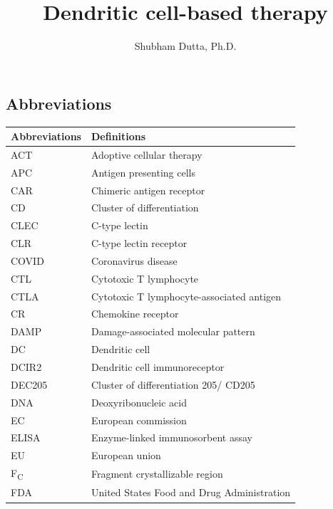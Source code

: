 \documentclass[
]{article}
\title{Dendritic cell-based therapy}
\author{Shubham Dutta, Ph.D.}
\affil{%
                  University of Massachusetts Medical School
              }
\date{}
\begin{document}
\maketitle


\subsection{Abbreviations}\label{abbreviations}

\begin{longtable}[]{@{}
  >{\raggedright\arraybackslash}p{}
  >{\raggedright\arraybackslash}p{}@{}}
\toprule\noalign{}
\begin{minipage}[b]{\linewidth}\raggedright
Abbreviations
\end{minipage} & \begin{minipage}[b]{\linewidth}\raggedright
Definitions
\end{minipage} \\
\midrule\noalign{}
\endhead
\bottomrule\noalign{}
\endlastfoot
ACT & Adoptive cellular therapy \\
APC & Antigen presenting cells \\
CAR & Chimeric antigen receptor \\
CD & Cluster of differentiation \\
CLEC & C-type lectin \\
CLR & C-type lectin receptor \\
COVID & Coronavirus disease \\
CTL & Cytotoxic T lymphocyte \\
CTLA & Cytotoxic T lymphocyte-associated antigen \\
CR & Chemokine receptor \\
DAMP & Damage-associated molecular pattern \\
DC & Dendritic cell \\
DCIR2 & Dendritic cell immunoreceptor \\
DEC205 & Cluster of differentiation 205/ CD205 \\
DNA & Deoxyribonucleic acid \\
EC & European commission \\
ELISA & Enzyme-linked immunosorbent assay \\
EU & European union \\
F\textsubscript{C} & Fragment crystallizable region \\
FDA & United States Food and Drug Administration \\

\end{longtable}
\end{document}
